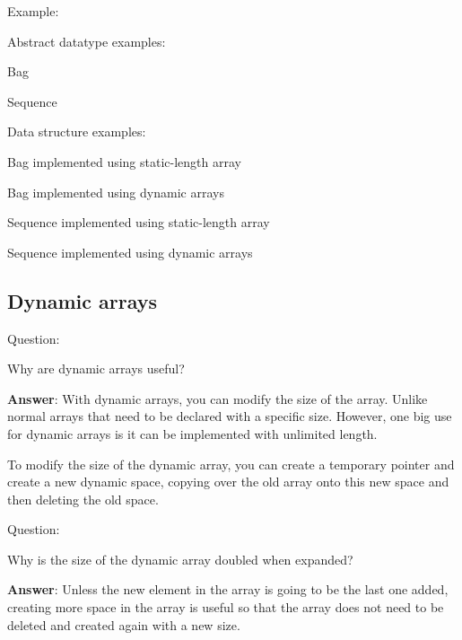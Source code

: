 \documentclass[11pt,a4paper,english]{paper}
\begin{document}
\begin{bluebox}{Example:}{

Abstract datatype examples:
\begin{itemize} {
    \item Bag
    \item Sequence
} \end{itemize}

\bigskip

Data structure examples:

\begin{itemize} {

    \item Bag implemented using static-length array
    \item Bag implemented using dynamic arrays
    \item Sequence implemented using static-length array
    \item Sequence implemented using dynamic arrays

  }

\end{itemize}

  }
\end{bluebox}

\bigskip

\subsection{Dynamic arrays}

\begin{gbox}{Question:} {

  Why are dynamic arrays useful?

  \bigskip

  \textbf{Answer}: With dynamic arrays, you can modify the size of the array. Unlike normal arrays that need to be declared with a specific size. However, one big use for dynamic arrays is it can be implemented with unlimited length.

  }
  \end{gbox}

  \bigskip

  \noindent To modify the size of the dynamic array, you can create a temporary pointer and create a new dynamic space, copying over the old array onto this new space and then deleting the old space.

  \bigskip

  \begin{gbox}{Question:} {
    Why is the size of the dynamic array doubled when expanded?

    \bigskip

    \textbf{Answer}: Unless the new element in the array is going to be the last one added, creating more space in the array is useful so that the array does not need to be deleted and created again with a new size.
    }

  \end{gbox}
\end{document}
